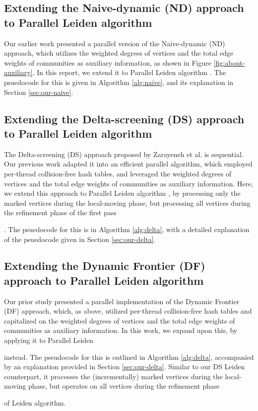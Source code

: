 \subsection{Extending the Naive-dynamic (ND) approach to Parallel Leiden algorithm}

Our earlier work \cite{sahu2024dflouvain} presented a parallel version of the Naive-dynamic (ND) approach, which utilizes the weighted degrees of vertices and the total edge weights of communities as auxiliary information, as shown in Figure \ref{fig:about-auxiliary}. In this report, we extend it to Parallel Leiden algorithm \cite{sahu2023gveleiden}. The psuedocode for this is given in Algorithm \ref{alg:naive}, and its explanation in Section \ref{sec:our-naive}.






\subsection{Extending the Delta-screening (DS) approach to Parallel Leiden algorithm}

The Delta-screening (DS) approach proposed by Zarayeneh et al. \cite{com-zarayeneh21} is sequential. Our previous work \cite{sahu2024dflouvain} adapted it into an efficient parallel algorithm, which employed per-thread collision-free hash tables, and leveraged the weighted degrees of vertices and the total edge weights of communities as auxiliary information. Here, we extend this approach to Parallel Leiden algorithm \cite{sahu2023gveleiden}, by processing only the marked vertices during the local-moving phase, but processing all vertices during the refinement phase of the first pass. The psuedocode for this is in Algorithm \ref{alg:delta}, with a detailed explanation of the psuedocode given in Section \ref{sec:our-delta}.




\subsection{Extending the Dynamic Frontier (DF) approach to Parallel Leiden algorithm}

Our prior study \cite{sahu2024dflouvain} presented a parallel implementation of the Dynamic Frontier (DF) approach, which, as above, utilized per-thread collision-free hash tables and capitalized on the weighted degrees of vertices and the total edge weights of communities as auxiliary information. In this work, we expand upon this, by applying it to Parallel Leiden instead. The pseudocode for this is outlined in Algorithm \ref{alg:delta}, accompanied by an explanation provided in Section \ref{sec:our-delta}. Similar to our DS Leiden counterpart, it processes the (incrementally) marked vertices during the local-moving phase, but operates on all vertices during the refinement phase of Leiden algorithm.
